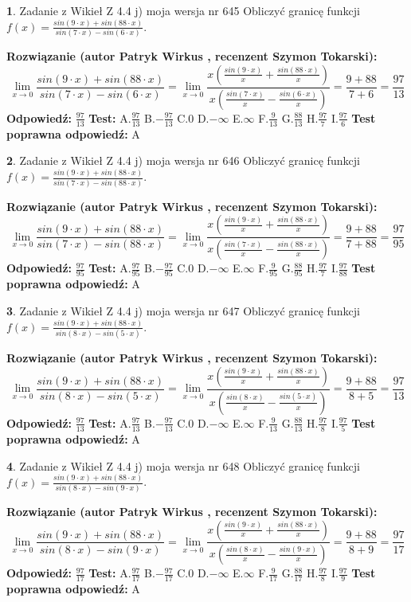 \documentclass[12pt, a4paper]{article}
\theoremstyle{definition} %
\newtheorem{zad}{}
\newcommand{\zadStart}[1]{\begin{zad}#1\newline}
\newcommand{\zadStop}{\end{zad}}
\newcommand{\rozwStart}[2]{\noindent \textbf{Rozwiązanie (autor #1 , recenzent #2): }\newline}
\newcommand{\rozwStop}{\newline}
\newcommand{\odpStart}{\noindent \textbf{Odpowiedź:}\newline}
\newcommand{\odpStop}{\newline}
\newcommand{\testStart}{\noindent \textbf{Test:}\newline}
\newcommand{\testStop}{\newline}
\newcommand{\kluczStart}{\noindent \textbf{Test poprawna odpowiedź:}\newline}
\newcommand{\kluczStop}{\newline}
\begin{document}
\zadStart{Zadanie z Wikieł Z 4.4 j) moja wersja nr 645}
Obliczyć granicę funkcji $f(x)=\frac{sin(9\cdot x) +sin(88\cdot x)}{sin(7\cdot x) -sin(6\cdot x)}$.
\zadStop
\rozwStart{Patryk Wirkus}{Szymon Tokarski}
$$\lim\limits_{x\to 0}\frac{sin(9\cdot x) +sin(88\cdot x)}{sin(7\cdot x) -sin(6\cdot x)}=\lim\limits_{x\to 0}\frac{x(\frac{sin(9\cdot x)}{x}+\frac{sin(88\cdot x)}{x})}{x(\frac{sin(7\cdot x)}{x}-\frac{sin(6\cdot x)}{x})}=\frac{9+88}{7+6} = \frac{97}{13}$$
\rozwStop
\odpStart
$\frac{97}{13}$
\odpStop
\testStart
A.$\frac{97}{13}$
B.$-\frac{97}{13}$
C.$0$
D.$-\infty$
E.$\infty$
F.$\frac{9}{13}$
G.$\frac{88}{13}$
H.$\frac{97}{7}$
I.$\frac{97}{6}$
\testStop
\kluczStart
A
\kluczStop



\zadStart{Zadanie z Wikieł Z 4.4 j) moja wersja nr 646}
Obliczyć granicę funkcji $f(x)=\frac{sin(9\cdot x) +sin(88\cdot x)}{sin(7\cdot x) -sin(88\cdot x)}$.
\zadStop
\rozwStart{Patryk Wirkus}{Szymon Tokarski}
$$\lim\limits_{x\to 0}\frac{sin(9\cdot x) +sin(88\cdot x)}{sin(7\cdot x) -sin(88\cdot x)}=\lim\limits_{x\to 0}\frac{x(\frac{sin(9\cdot x)}{x}+\frac{sin(88\cdot x)}{x})}{x(\frac{sin(7\cdot x)}{x}-\frac{sin(88\cdot x)}{x})}=\frac{9+88}{7+88} = \frac{97}{95}$$
\rozwStop
\odpStart
$\frac{97}{95}$
\odpStop
\testStart
A.$\frac{97}{95}$
B.$-\frac{97}{95}$
C.$0$
D.$-\infty$
E.$\infty$
F.$\frac{9}{95}$
G.$\frac{88}{95}$
H.$\frac{97}{7}$
I.$\frac{97}{88}$
\testStop
\kluczStart
A
\kluczStop



\zadStart{Zadanie z Wikieł Z 4.4 j) moja wersja nr 647}
Obliczyć granicę funkcji $f(x)=\frac{sin(9\cdot x) +sin(88\cdot x)}{sin(8\cdot x) -sin(5\cdot x)}$.
\zadStop
\rozwStart{Patryk Wirkus}{Szymon Tokarski}
$$\lim\limits_{x\to 0}\frac{sin(9\cdot x) +sin(88\cdot x)}{sin(8\cdot x) -sin(5\cdot x)}=\lim\limits_{x\to 0}\frac{x(\frac{sin(9\cdot x)}{x}+\frac{sin(88\cdot x)}{x})}{x(\frac{sin(8\cdot x)}{x}-\frac{sin(5\cdot x)}{x})}=\frac{9+88}{8+5} = \frac{97}{13}$$
\rozwStop
\odpStart
$\frac{97}{13}$
\odpStop
\testStart
A.$\frac{97}{13}$
B.$-\frac{97}{13}$
C.$0$
D.$-\infty$
E.$\infty$
F.$\frac{9}{13}$
G.$\frac{88}{13}$
H.$\frac{97}{8}$
I.$\frac{97}{5}$
\testStop
\kluczStart
A
\kluczStop



\zadStart{Zadanie z Wikieł Z 4.4 j) moja wersja nr 648}
Obliczyć granicę funkcji $f(x)=\frac{sin(9\cdot x) +sin(88\cdot x)}{sin(8\cdot x) -sin(9\cdot x)}$.
\zadStop
\rozwStart{Patryk Wirkus}{Szymon Tokarski}
$$\lim\limits_{x\to 0}\frac{sin(9\cdot x) +sin(88\cdot x)}{sin(8\cdot x) -sin(9\cdot x)}=\lim\limits_{x\to 0}\frac{x(\frac{sin(9\cdot x)}{x}+\frac{sin(88\cdot x)}{x})}{x(\frac{sin(8\cdot x)}{x}-\frac{sin(9\cdot x)}{x})}=\frac{9+88}{8+9} = \frac{97}{17}$$
\rozwStop
\odpStart
$\frac{97}{17}$
\odpStop
\testStart
A.$\frac{97}{17}$
B.$-\frac{97}{17}$
C.$0$
D.$-\infty$
E.$\infty$
F.$\frac{9}{17}$
G.$\frac{88}{17}$
H.$\frac{97}{8}$
I.$\frac{97}{9}$
\testStop
\kluczStart
A
\kluczStop
\end{document}
